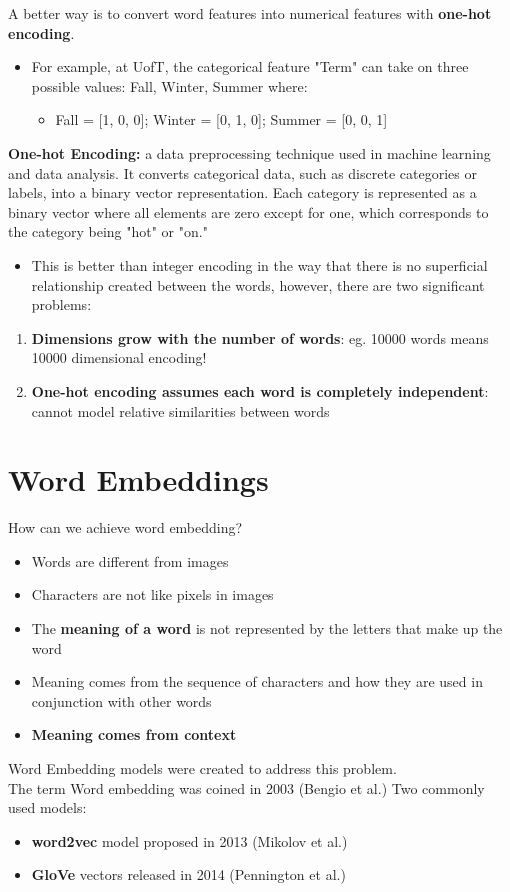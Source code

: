 A better way is to convert word features into numerical features with \textbf{one-hot encoding}. 
\begin{itemize}
    \item For example, at UofT, the categorical feature "Term" can take on three possible values: Fall, Winter, Summer where:
    \begin{itemize}
        \item Fall = [1, 0, 0]; Winter = [0, 1, 0]; Summer = [0, 0, 1]
    \end{itemize}
\end{itemize}

\begin{definition}
\textbf{One-hot Encoding:} a data preprocessing technique used in machine learning and data analysis. It converts categorical data, such as discrete categories or labels, into a binary vector representation. Each category is represented as a binary vector where all elements are zero except for one, which corresponds to the category being "hot" or "on."
\end{definition}

\begin{itemize}
    \item This is better than integer encoding in the way that there is no superficial relationship created between the words, however, there are two significant problems:
\end{itemize}
\begin{enumerate}
    \item \textbf{Dimensions grow with the number of words}: eg. 10000 words means 10000 dimensional encoding!
    \item \textbf{One-hot encoding assumes each word is completely independent}: cannot model relative similarities between words
\end{enumerate}


\section{Word Embeddings}
How can we achieve word embedding?
\begin{itemize}
  \item Words are different from images
  \item Characters are not like pixels in images
  \item The \textbf{meaning of a word} is not represented by the letters that make up the word
  \item Meaning comes from the sequence of characters and how they are used in conjunction with other words
  \item \textbf{Meaning comes from context}
\end{itemize}
Word Embedding models were created to address this problem. \\
The term Word embedding was coined in 2003 (Bengio et al.)
Two commonly used models:
\begin{itemize}
  \item \textbf{word2vec} model proposed in 2013 (Mikolov et al.)
  \item \textbf{GloVe} vectors released in 2014 (Pennington et al.)
\end{itemize}

